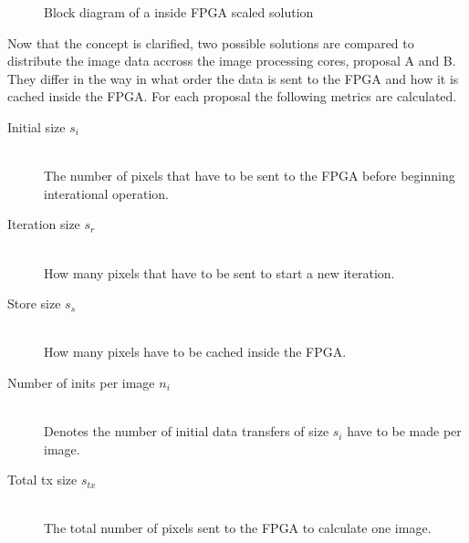 \begin{figure}[tb!]
    \centering
    \begin{adjustbox}{max width=\linewidth}
        
    \end{adjustbox}
    \caption{Block diagram of a inside FPGA scaled solution}
    \label{fig:insidefpgascaleconceptbd}
\end{figure}

Now that the concept is clarified, two possible solutions are compared to
distribute the image data accross the image processing cores, proposal A and B.
They differ in the way in what order the data is sent to the FPGA and how it is
cached inside the FPGA. For each proposal the following metrics are calculated.

\begin{description}
    \item[Initial size $s_i$]\hfill \\
    The number of pixels that have to be sent to the FPGA before beginning
    interational operation.
    \item[Iteration size $s_r$]\hfill \\
    How many pixels that have to be sent to start a new iteration.
    \item[Store size $s_s$]\hfill \\
    How many pixels have to be cached inside the FPGA.
    \item[Number of inits per image $n_i$]\hfill \\
    Denotes the number of initial data transfers of size $s_i$ have to be made
    per image.
    \item[Total tx size $s_{tx}$]\hfill \\
    The total number of pixels sent to the FPGA to calculate one image.
\end{description}


